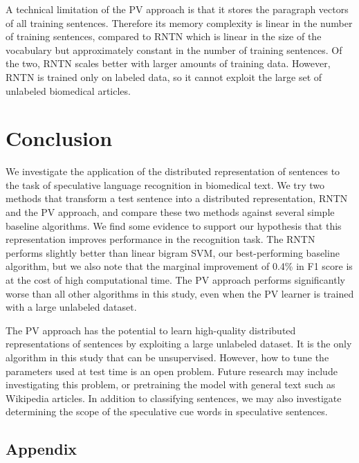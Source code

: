 \documentclass{article}
\begin{document}
A technical limitation of the PV approach is that it stores the paragraph vectors of all training sentences. Therefore its memory complexity is linear in the number of training sentences, compared to RNTN which is linear in the size of the vocabulary but approximately constant in the number of training sentences. Of the two, RNTN scales better with larger amounts of training data. However, RNTN is trained only on labeled data, so it cannot exploit the large set of unlabeled biomedical articles.
%
%

\section{Conclusion}

We investigate the application of the distributed representation of sentences to the task of speculative language recognition in biomedical text. We try two methods that transform a test sentence into a distributed representation, RNTN and the PV approach, and compare these two methods against several simple baseline algorithms. We find some evidence to support our hypothesis that this representation improves performance in the recognition task. The RNTN performs slightly better than linear bigram SVM, our best-performing baseline algorithm, but we also note that the marginal improvement of 0.4\% in F1 score is at the cost of high computational time. The PV approach performs significantly worse than all other algorithms in this study, even when the PV learner is trained with a large unlabeled dataset. 

The PV approach has the potential to learn high-quality distributed representations of sentences by exploiting a large unlabeled dataset. It is the only algorithm in this study that can be unsupervised. However, how to tune the parameters used at test time is an open problem. Future research may include investigating this problem, or pretraining the model with general text such as Wikipedia articles. In addition to classifying sentences, we may also investigate determining the scope of the speculative cue words in speculative sentences.

\printbibliography{}

\pagebreak
\begin{center}
\section*{Appendix}
\end{center}
\end{document}
